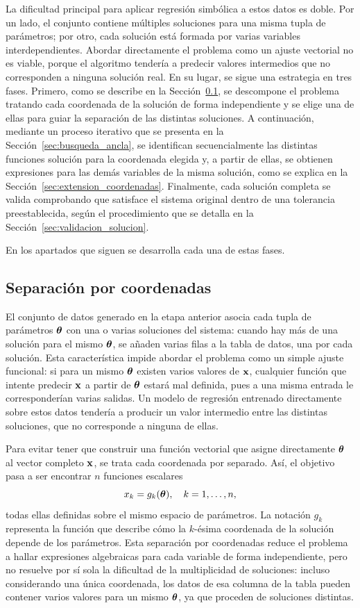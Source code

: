 La dificultad principal para aplicar regresión simbólica a estos datos es doble. Por un lado, el conjunto contiene múltiples soluciones para una misma tupla de parámetros; por otro, cada solución está formada por varias variables interdependientes. Abordar directamente el problema como un ajuste vectorial no es viable, porque el algoritmo tendería a predecir valores intermedios que no corresponden a ninguna solución real. En su lugar, se sigue una estrategia en tres fases. Primero, como se describe en la Sección~\ref{sec:desacoplamiento}, se descompone el problema tratando cada coordenada de la solución de forma independiente y se elige una de ellas para guiar la separación de las distintas soluciones. A continuación, mediante un proceso iterativo que se presenta en la Sección~\ref{sec:busqueda_ancla}, se identifican secuencialmente las distintas funciones solución para la coordenada elegida y, a partir de ellas, se obtienen expresiones para las demás variables de la misma solución, como se explica en la Sección~\ref{sec:extension_coordenadas}. Finalmente, cada solución completa se valida comprobando que satisface el sistema original dentro de una tolerancia preestablecida, según el procedimiento que se detalla en la Sección~\ref{sec:validacion_solucion}.

En los apartados que siguen se desarrolla cada una de estas fases.

\subsection{Separación por coordenadas} \label{sec:desacoplamiento}

El conjunto de datos generado en la etapa anterior asocia cada tupla de parámetros \(\boldsymbol{\theta}\) con una o varias soluciones del sistema: cuando hay más de una solución para el mismo \(\boldsymbol{\theta}\), se añaden varias filas a la tabla de datos, una por cada solución. Esta característica impide abordar el problema como un simple ajuste funcional: si para un mismo \(\boldsymbol{\theta}\) existen varios valores de \(\mathbf{x}\), cualquier función que intente predecir \(\mathbf{x}\) a partir de \(\boldsymbol{\theta}\) estará mal definida, pues a una misma entrada le corresponderían varias salidas. Un modelo de regresión entrenado directamente sobre estos datos tendería a producir un valor intermedio entre las distintas soluciones, que no corresponde a ninguna de ellas.

Para evitar tener que construir una función vectorial que asigne directamente \(\boldsymbol{\theta}\) al vector completo \(\mathbf{x}\), se trata cada coordenada por separado. Así, el objetivo pasa a ser encontrar \(n\) funciones escalares \[ x_k = g_k(\boldsymbol{\theta}), \quad k = 1, \dots, n, \] todas ellas definidas sobre el mismo espacio de parámetros. La notación \(g_k\) representa la función que describe cómo la \(k\)-ésima coordenada de la solución depende de los parámetros. Esta separación por coordenadas reduce el problema a hallar expresiones algebraicas para cada variable de forma independiente, pero no resuelve por sí sola la dificultad de la multiplicidad de soluciones: incluso considerando una única coordenada, los datos de esa columna de la tabla pueden contener varios valores para un mismo \(\boldsymbol{\theta}\), ya que proceden de soluciones distintas.

